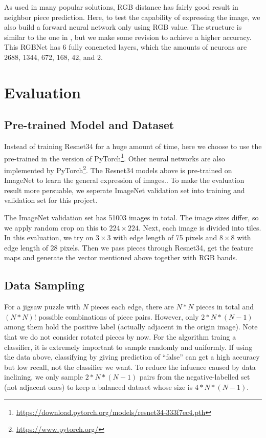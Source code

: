 \documentclass{article}
\begin{document}
As used in many popular solutions, RGB distance has fairly good result in neighbor piece prediction. Here, to test the capability of expressing the image, we also build a forward neural network only using RGB value. The structure is similar to the one in \cite{sholomon2016dnn}, but we make some revision to achieve a higher accuracy. This RGBNet has 6 fully conencted layers, which the amounts of neurons are 2688, 1344, 672, 168, 42, and 2.

\section{Evaluation}

\subsection{Pre-trained Model and Dataset}

Instead of training Resnet34 for a huge amount of time, here we choose to use the pre-trained in the version of PyTorch\footnote{\url{https://download.pytorch.org/models/resnet34-333f7ec4.pth}}. Other neural networks are also implemented by PyTorch\footnote{\url{https://www.pytorch.org/}}. The Resnet34 models above is pre-trained on ImageNet\cite{krizhevsky2012imagenet} to learn the general expression of images.. To make the evaluation result more persuable, we seperate ImageNet validation set into training and validation set for this project.

The ImageNet validation set has 51003 images in total. The image sizes differ, so we apply random crop on this to $224\times224$. Next, each image is divided into tiles. In this evaluation, we try on $3\times3$ with edge length of 75 pixels and $8\times8$ with edge length of 28 pixels. Then we pass pieces through Resnet34, get the feature maps and generate the vector mentioned above together with RGB bands.

\subsection{Data Sampling}

For a jigsaw puzzle with $N$ pieces each edge, there are $N*N$ pieces in total and $(N*N)!$ possible combinations of piece pairs. However, only $2*N*(N-1)$ among them hold the positive label (actually adjacent in the origin image). Note that we do not consider rotated pieces by now. For the algorithm traing a classifier, it is extremely important to sample randomly and uniformly. If using the data above, classifying by giving prediction of ``false'' can get a high accuracy but low recall, not the classifier we want. To reduce the infuence caused by data inclining, we only sample $2*N*(N-1)$ pairs from the negative-labelled set (not adjacent ones) to keep a balanced dataset whose size is $4*N*(N-1)$.
\end{document}
